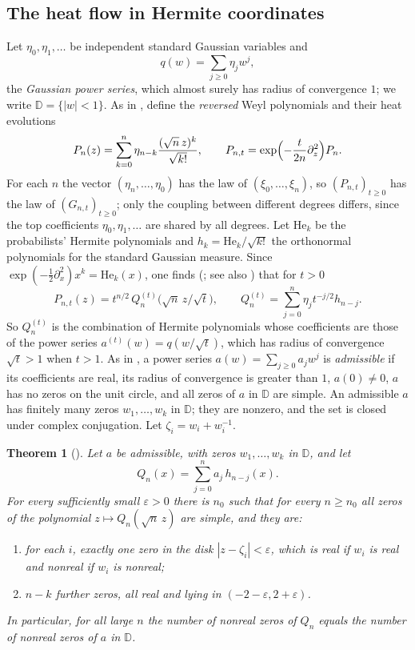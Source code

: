 \documentclass[11pt]{amsart}
\newtheorem{theoremA}{Theorem}
\theoremstyle{definition}
\theoremstyle{remark}
\numberwithin{equation}{section}
\newcommand{\D}{\mathbb{D}}
\newcommand{\eps}{\varepsilon}
\newcommand{\He}{\mathrm{He}}
\begin{document}
\subsection{The heat flow in Hermite coordinates}
Let $\eta_0,\eta_1,\dots$ be independent standard Gaussian variables and
\begin{equation}\label{eq:kac}
q(w)=\sum_{j\ge0}\eta_jw^j ,
\end{equation}
the \emph{Gaussian power series}, which almost surely has radius of convergence $1$; we write $\D=\{|w|<1\}$. As in \cite{Main}, define the \emph{reversed} Weyl polynomials and their heat evolutions
\begin{equation}\label{eq:reversed}
P_n(z)=\sum_{k=0}^{n}\eta_{n-k}\frac{(\sqrt n\,z)^k}{\sqrt{k!}},\qquad P_{n,t}=\exp\Bigl(-\frac{t}{2n}\partial_z^2\Bigr)P_n .
\end{equation}
For each $n$ the vector $(\eta_n,\dots,\eta_0)$ has the law of $(\xi_0,\dots,\xi_n)$, so $(P_{n,t})_{t\ge0}$ has the law of $(G_{n,t})_{t\ge0}$; only the coupling between different degrees differs, since the top coefficients $\eta_0,\eta_1,\dots$ are shared by all degrees. Let $\He_k$ be the probabilists' Hermite polynomials and $h_k=\He_k/\sqrt{k!}$ the orthonormal polynomials for the standard Gaussian measure. Since $\exp(-\frac12\partial_x^2)x^k=\He_k(x)$, one finds (\cite[Lemma~\ref{M-lem:heat}(a)]{Main}; see also \cite[\eqref{M-eq:PQ}]{Main}) that for $t>0$
\begin{equation}\label{eq:PQ}
P_{n,t}(z)=t^{n/2}\,Q_n^{(t)}\bigl(\sqrt n\,z/\sqrt t\bigr),\qquad Q_n^{(t)}=\sum_{j=0}^{n}\eta_jt^{-j/2}h_{n-j}.
\end{equation}
So $Q_n^{(t)}$ is the combination of Hermite polynomials whose coefficients are those of the power series $a^{(t)}(w)=q(w/\sqrt t)$, which has radius of convergence $\sqrt t>1$ when $t>1$. As in \cite[Definition~\ref{M-def:admissible}]{Main}, a power series $a(w)=\sum_{j\ge0}a_jw^j$ is \emph{admissible} if its coefficients are real, its radius of convergence is greater than $1$, $a(0)\neq0$, $a$ has no zeros on the unit circle, and all zeros of $a$ in $\D$ are simple. An admissible $a$ has finitely many zeros $w_1,\dots,w_k$ in $\D$; they are nonzero, and the set is closed under complex conjugation. Let $\zeta_i=w_i+w_i^{-1}$.

\begin{theoremA}[{\cite[Theorem~\ref{M-thm:main}]{Main}}]\label{thm:A}
Let $a$ be admissible, with zeros $w_1,\dots,w_k$ in $\D$, and let
\[
Q_n(x)=\sum_{j=0}^{n}a_j\,h_{n-j}(x).
\]
For every sufficiently small $\eps>0$ there is $n_0$ such that for every $n\ge n_0$ all zeros of the polynomial $z\mapsto Q_n(\sqrt n\,z)$ are simple, and they are:
\begin{enumerate}
\item[(a)] for each $i$, exactly one zero in the disk $|z-\zeta_i|<\eps$, which is real if $w_i$ is real and nonreal if $w_i$ is nonreal;
\item[(b)] $n-k$ further zeros, all real and lying in $(-2-\eps,2+\eps)$.
\end{enumerate}
In particular, for all large $n$ the number of nonreal zeros of $Q_n$ equals the number of nonreal zeros of $a$ in $\D$.
\end{theoremA}
\end{document}
